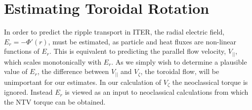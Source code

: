 \documentclass{article}
\numberwithin{figure}{section}
\numberwithin{equation}{section}
\begin{document}
\FloatBarrier

\section{Estimating Toroidal Rotation}\label{rotation}

In order to predict the ripple transport in ITER, the radial electric field, $E_r = - \Phi'(r) $, must be estimated, as particle and heat fluxes are non-linear functions of $E_r$. This is equivalent to predicting the parallel flow velocity, $V_{||}$, which scales monotonically with $E_r$.  As we simply wish to determine a plausible value of $E_r$, the difference between $V_{||}$ and $V_{\zeta}$, the toroidal flow, will be unimportant for our estimates. In our calculation of $V_{\zeta}$ the neoclassical torque is ignored. Instead $E_r$ is viewed as an input to neoclassical calculations from which the NTV torque can be obtained. 
\end{document}

